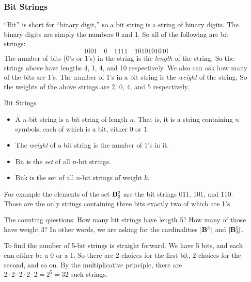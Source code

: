 \documentclass[12pt]{article}
\begin{document}
\subsubsection*{Bit Strings}

``Bit'' is short for ``binary digit,'' so a bit string is a string of binary digits.  The binary digits are simply the numbers 0 and 1.  So all of the following are bit strings:
\[1001 \quad 0 \quad 1111 \quad 1010101010\]
The number of bits (0's or 1's) in the string is the {\em length} of the string.  So the strings above have lengths 4, 1, 4, and 10 respectively.  We also can ask how many of the bits are 1's.  The number of 1's in a bit string is the {\em weight} of the string.  So the weights of the above strings are 2, 0, 4, and 5 respectively.

\begin{defbox}{Bit Strings}
  \begin{itemize}
    \item A $n$-bit string is a bit string of length $n$.  That is, it is a string containing $n$ symbols, each of which is a bit, either 0 or 1.
    \item The {\em weight} of a bit string is the number of 1's in it.
    \item \gls{Bn} is the {\em set} of all $n$-bit strings.
    \item \gls{Bnk} is the set of all $n$-bit strings of weight $k$.
  \end{itemize}
\end{defbox}

For example the elements of the set $\mathbf{B}^3_2$ are the bit strings 011, 101, and 110.  Those are the only strings containing three bits exactly two of which are 1's.

The counting questions: How many bit strings have length 5?  How many of those have weight 3?  In other words, we are asking for the cardinalities $|\mathbf{B}^5|$ and $|\mathbf{B}^5_3|$.  

To find the number of 5-bit strings is straight forward.  We have 5 bits, and each can either be a 0 or a 1.  So there are 2 choices for the first bit, 2 choices for the second, and so on.  By the multiplicative principle, there are $2 \cdot 2 \cdot 2\cdot 2 \cdot 2 = 2^5 = 32$ such strings.  
\end{document}
